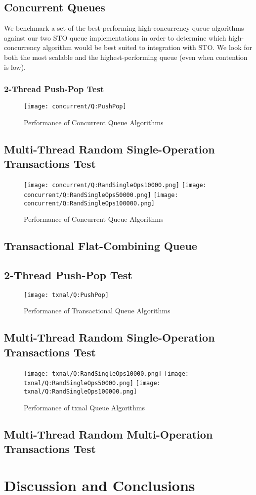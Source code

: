 \subsection{Concurrent Queues}

We benchmark a set of the best-performing high-concurrency queue algorithms against our two STO queue implementations in order to determine which high-concurrency algorithm would be best suited to integration with STO. We look for both the most scalable and the highest-performing queue (even when contention is low).

\subsubsection{2-Thread Push-Pop Test}
\begin{figure}[ht!]
\centering
\texttt{[image: concurrent/Q:PushPop]}
\caption{Performance of Concurrent Queue Algorithms}
\label{fig:concurrent_queues_pushpop}
\end{figure}

\subsection{Multi-Thread Random Single-Operation Transactions Test}
\begin{figure}[ht!]
\centering
\texttt{[image: concurrent/Q:RandSingleOps10000.png]}
\texttt{[image: concurrent/Q:RandSingleOps50000.png]}
\texttt{[image: concurrent/Q:RandSingleOps100000.png]}
\caption{Performance of Concurrent Queue Algorithms}
\label{fig:concurrent_queues_rand}
\end{figure}

\subsection{Transactional Flat-Combining Queue}

\subsection{2-Thread Push-Pop Test}
\begin{figure}[ht!]
\centering
\texttt{[image: txnal/Q:PushPop]}
\caption{Performance of Transactional Queue Algorithms}
\label{fig:txnal_queues}
\end{figure}

\subsection{Multi-Thread Random Single-Operation Transactions Test}
\begin{figure}[ht!]
\centering
\texttt{[image: txnal/Q:RandSingleOps10000.png]}
\texttt{[image: txnal/Q:RandSingleOps50000.png]}
\texttt{[image: txnal/Q:RandSingleOps100000.png]}
\caption{Performance of txnal Queue Algorithms}
\label{fig:txnal_queues}
\end{figure}

\subsection{Multi-Thread Random Multi-Operation Transactions Test}

\section{Discussion and Conclusions}
